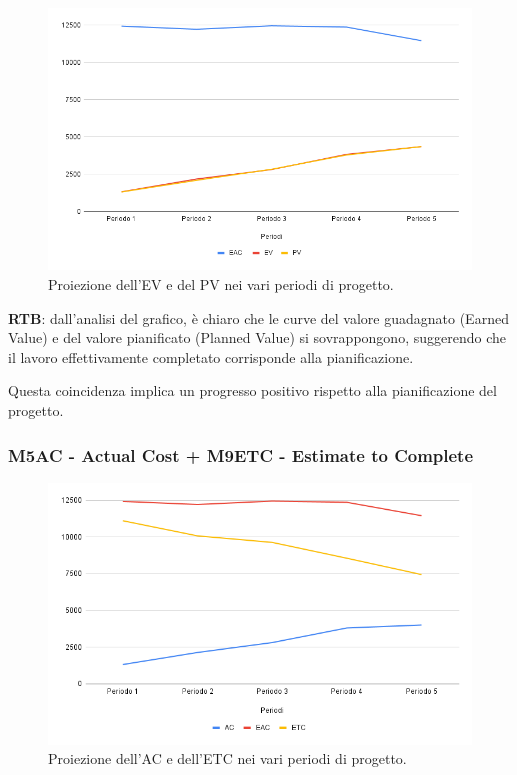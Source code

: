 \begin{figure}[H]
    \centering
    \includegraphics[width=1\textwidth]{../Images/PianoDiQualifica/EV_PV.png}
    \caption{Proiezione dell’EV e del PV nei vari periodi di progetto.}
    \label{fig:3}
\end{figure}

\vspace{0.2cm}

\textbf{RTB}: dall'analisi del grafico, è chiaro che le curve del valore guadagnato (Earned Value) e del valore pianificato (Planned Value) si sovrappongono, suggerendo che il lavoro effettivamente completato corrisponde alla pianificazione. 

\vspace{0.2cm}

Questa coincidenza implica un progresso positivo rispetto alla pianificazione del progetto.

\subsubsection{M5AC - Actual Cost + M9ETC - Estimate to Complete}

\vspace{0.3cm}

\begin{figure}[H]
    \centering
    \includegraphics[width=1\textwidth]{../Images/PianoDiQualifica/AC_ETC.png}
    \caption{Proiezione dell’AC e dell’ETC nei vari periodi di progetto.}
    \label{fig:4}
\end{figure}

